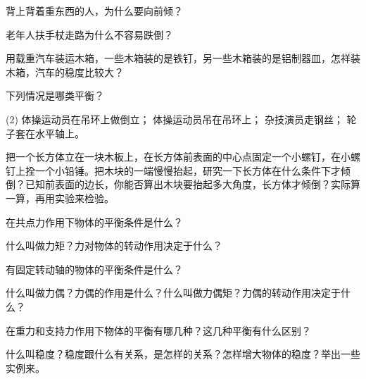 \begin{Practice}
\begin{question}
  \item 背上背着重东西的人，为什么要向前倾？
  \item 老年人扶手杖走路为什么不容易跌倒？
  \item 用载重汽车装运木箱，一些木箱装的是铁钉，另一些木箱装的是铝制器皿，怎祥装木箱，汽车的稳度比较大？
  \item 下列情况是哪类平衡？
  \begin{tasks}(2)
    \task 体操运动员在吊环上做倒立；
    \task 体操运动员吊在吊环上；
    \task 杂技演员走钢丝；
    \task 轮子套在水平轴上。
  \end{tasks}
  \item 把一个长方体立在一块木板上，在长方体前表面的中心点固定一个小螺钉，在小螺钉上拴一个小铅锤。把木块的一端慢慢抬起，研究一下长方体在什么条件下才倾倒？已知前表面的边长，你能否算出木块要抬起多大角度，长方体才倾倒？实际算一算，再用实验来检验。
\end{question}
\end{Practice}

\begin{Review}
\begin{question}
  \item 在共点力作用下物体的平衡条件是什么？
  \item 什么叫做力矩？力对物体的转动作用决定于什么？
  \item 有固定转动轴的物体的平衡条件是什么？
  \item 什么叫做力偶？力偶的作用是什么？什么叫做力偶矩？力偶的转动作用决定于什么？
  \item 在重力和支持力作用下物体的平衡有哪几种？这几种平衡有什么区别？
  \item 什么叫稳度？稳度跟什么有关系，是怎样的关系？怎样增大物体的稳度？举出一些实例来。
\end{question}
\end{Review}

